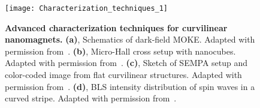 %


\begin{figure}[t]
	\centering
	\texttt{[image: Characterization\_techniques\_1]}
	\caption{\label{fig:Characterization_techniques}%
		\textbf{Advanced characterization techniques for curvilinear nanomagnets.} \textbf{(a)}, Schematics of dark-field MOKE. Adapted with permission from~\cite{Sanz-Hernandez17}. \textbf{(b)}, Micro-Hall cross setup with nanocubes. Adapted with permission from~\cite{Mamoori18}. \textbf{(c)}, Sketch of SEMPA setup and color-coded image from flat curvilinear structures. Adapted with permission from~\cite{Schoenke20}. \textbf{(d)}, BLS intensity distribution of spin waves in a curved stripe. Adapted with permission from~\cite{Vogt12}.
	}
\end{figure}


